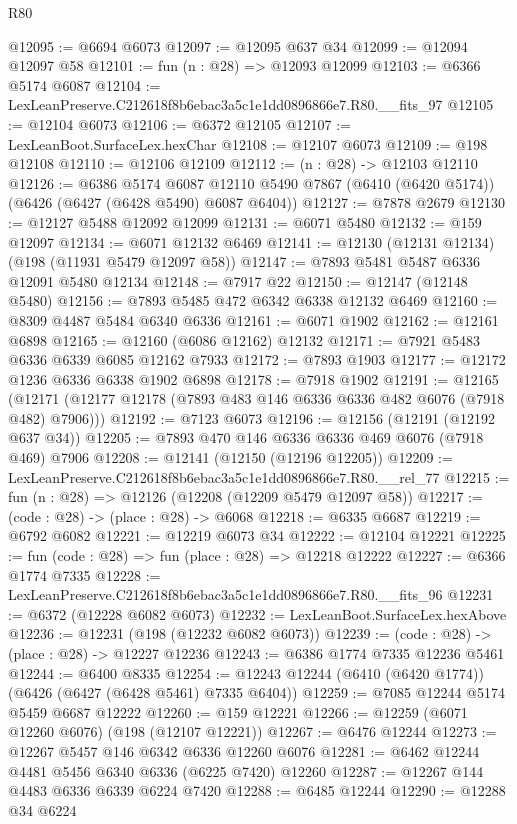 \begin{lexlean}{R80}
\begin{coremodule}
@12095 := @6694 @6073
@12097 := @12095 @637 @34
@12099 := @12094 @12097 @58
@12101 := fun (n : @28) => @12093 @12099
@12103 := @6366 @5174 @6087
@12104 := LexLeanPreserve.C212618f8b6ebac3a5c1e1dd0896866e7.R80.__fits_97
@12105 := @12104 @6073
@12106 := @6372 @12105
@12107 := LexLeanBoot.SurfaceLex.hexChar
@12108 := @12107 @6073
@12109 := @198 @12108
@12110 := @12106 @12109
@12112 := (n : @28) -> @12103 @12110
@12126 := @6386
    @5174
    @6087
    @12110
    @5490
    @7867
    (@6410 (@6420 @5174))
    (@6426 (@6427 (@6428 @5490) @6087 @6404))
@12127 := @7878 @2679
@12130 := @12127 @5488 @12092 @12099
@12131 := @6071 @5480
@12132 := @159 @12097
@12134 := @6071 @12132 @6469
@12141 := @12130 (@12131 @12134) (@198 (@11931 @5479 @12097 @58))
@12147 := @7893 @5481 @5487 @6336 @12091 @5480 @12134
@12148 := @7917 @22
@12150 := @12147 (@12148 @5480)
@12156 := @7893 @5485 @472 @6342 @6338 @12132 @6469
@12160 := @8309 @4487 @5484 @6340 @6336
@12161 := @6071 @1902
@12162 := @12161 @6898
@12165 := @12160 (@6086 @12162) @12132
@12171 := @7921 @5483 @6336 @6339 @6085 @12162 @7933
@12172 := @7893 @1903
@12177 := @12172 @1236 @6336 @6338 @1902 @6898
@12178 := @7918 @1902
@12191 := @12165
    (@12171 (@12177 @12178 (@7893 @483 @146 @6336 @6336 @482 @6076 (@7918 @482) @7906)))
@12192 := @7123 @6073
@12196 := @12156 (@12191 (@12192 @637 @34))
@12205 := @7893 @470 @146 @6336 @6336 @469 @6076 (@7918 @469) @7906
@12208 := @12141 (@12150 (@12196 @12205))
@12209 := LexLeanPreserve.C212618f8b6ebac3a5c1e1dd0896866e7.R80.__rel_77
@12215 := fun (n : @28) => @12126 (@12208 (@12209 @5479 @12097 @58))
@12217 := (code : @28) -> (place : @28) -> @6068
@12218 := @6335 @6687
@12219 := @6792 @6082
@12221 := @12219 @6073 @34
@12222 := @12104 @12221
@12225 := fun (code : @28) => fun (place : @28) => @12218 @12222
@12227 := @6366 @1774 @7335
@12228 := LexLeanPreserve.C212618f8b6ebac3a5c1e1dd0896866e7.R80.__fits_96
@12231 := @6372 (@12228 @6082 @6073)
@12232 := LexLeanBoot.SurfaceLex.hexAbove
@12236 := @12231 (@198 (@12232 @6082 @6073))
@12239 := (code : @28) -> (place : @28) -> @12227 @12236
@12243 := @6386 @1774 @7335 @12236 @5461
@12244 := @6400 @8335
@12254 := @12243 @12244 (@6410 (@6420 @1774)) (@6426 (@6427 (@6428 @5461) @7335 @6404))
@12259 := @7085 @12244 @5174 @5459 @6687 @12222
@12260 := @159 @12221
@12266 := @12259 (@6071 @12260 @6076) (@198 (@12107 @12221))
@12267 := @6476 @12244
@12273 := @12267 @5457 @146 @6342 @6336 @12260 @6076
@12281 := @6462 @12244 @4481 @5456 @6340 @6336 (@6225 @7420) @12260
@12287 := @12267 @144 @4483 @6336 @6339 @6224 @7420
@12288 := @6485 @12244
@12290 := @12288 @34 @6224

\end{coremodule}
\end{lexlean}
